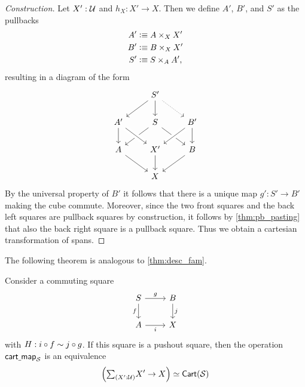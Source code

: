 \begin{proof}[Construction]
Let $X':\mathcal{U}$ and $h_X:X'\to X$. Then we define $A'$, $B'$, and $S'$ as the pullbacks
\begin{align*}
A' & \vcentcolon\equiv A\times_X X' \\
B' & \vcentcolon\equiv B\times_X X' \\
S' & \vcentcolon\equiv S\times_A A',
\end{align*}
resulting in a diagram of the form
\begin{equation*}
\begin{tikzcd}
& S' \arrow[dl] \arrow[dr,densely dotted] \arrow[d] \\
A' \arrow[d] & S \arrow[dl] \arrow[dr] & B' \arrow[dl,crossing over] \arrow[d] \\
A \arrow[dr] & X' \arrow[d] \arrow[from=ul,crossing over] & B \arrow[dl] \\
& X
\end{tikzcd}
\end{equation*}
By the universal property of $B'$ it follows that there is a unique map $g':S'\to B'$ making the cube commute. 
Moreover, since the two front squares and the back left squares are pullback squares by construction, it follows by \cref{thm:pb_pasting} that also the back right square is a pullback square. Thus we obtain a cartesian transformation of spans.
\end{proof}

The following theorem is analogous to \cref{thm:desc_fam}.

\begin{thm}\label{thm:descent}
Consider a commuting square
\begin{equation*}
\begin{tikzcd}
S \arrow[r,"g"] \arrow[d,swap,"f"] & B \arrow[d,"j"] \\
A \arrow[r,swap,"i"] & X
\end{tikzcd}
\end{equation*}
with $H:i\circ f\sim j\circ g$. 
If this square is a pushout square, then the operation $\mathsf{cart\underline{\ }{}map}_{\mathcal{S}}$ is an equivalence
\begin{equation*}
\eqv{\Big(\sm{X':\UU}X'\to X\Big)}{\mathsf{Cart}(\mathcal{S})}
\end{equation*}
\end{thm}

